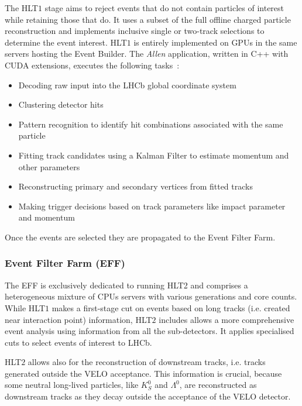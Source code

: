 The HLT$1$ stage aims to reject events that do not contain particles of interest while retaining those that do. It uses a subset of the full offline charged particle reconstruction and implements inclusive single or two-track selections to determine the event interest. HLT$1$ is entirely implemented on GPUs in the same servers hosting the Event Builder. The \textit{Allen} application, written in C++ with CUDA extensions, executes the following tasks~\cite{CERN-LHCC-2020-006}:
\begin{itemize}
\item Decoding raw input into the LHCb global coordinate system
\item Clustering detector hits
\item Pattern recognition to identify hit combinations associated with the same particle
\item Fitting track candidates using a Kalman Filter to estimate momentum and other parameters
\item Reconstructing primary and secondary vertices from fitted tracks
\item Making trigger decisions based on track parameters like impact parameter and momentum
\end{itemize}
Once the events are selected they are propagated to the Event Filter Farm. 


\subsubsection{Event Filter Farm (EFF)}

The EFF is exclusively dedicated to running HLT2 and comprises a heterogeneous mixture of CPUs servers with various generations and core counts. 
While HLT$1$ makes a first-stage cut on events based on long tracks (i.e. created near interaction point) information, HLT$2$ includes allows a more comprehensive event analysis using information from all the sub-detectors. It applies specialised cuts to select events of interest to LHCb. 

HLT$2$ allows also for the reconstruction of downstream tracks, i.e. tracks generated outside the VELO acceptance. This information is crucial, because some neutral long-lived particles, like $K^0_S$ and $\Lambda^0$, are reconstructed as downstream tracks as they decay outside the acceptance of the VELO detector. 



